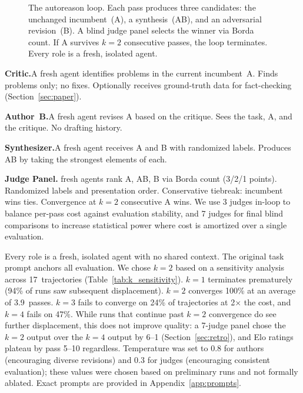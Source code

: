 \documentclass[11pt]{article}
\begin{document}
\begin{figure}[!ht]
{%
}%
\caption{The autoreason loop. Each pass produces three candidates: the unchanged incumbent~(A), a synthesis~(AB), and an adversarial revision~(B). A blind judge panel selects the winner via Borda count. If A survives $k{=}2$ consecutive passes, the loop terminates. Every role is a fresh, isolated agent.}
\label{fig:method}
\end{figure}

\textbf{Critic.}\enspace A fresh agent identifies problems in the current incumbent~A. Finds problems only; no fixes. Optionally receives ground-truth data for fact-checking (Section~\ref{sec:paper}).

\textbf{Author~B.}\enspace A fresh agent revises A based on the critique. Sees the task, A, and the critique. No drafting history.

\textbf{Synthesizer.}\enspace A fresh agent receives A and B with randomized labels. Produces AB by taking the strongest elements of each.

\textbf{Judge Panel.} fresh agents rank A, AB, B via Borda count (3/2/1 points). Randomized labels and presentation order. Conservative tiebreak: incumbent wins ties. Convergence at $k{=}2$ consecutive A wins. We use 3 judges in-loop to balance per-pass cost against evaluation stability, and 7 judges for final blind comparisons to increase statistical power where cost is amortized over a single evaluation.

Every role is a fresh, isolated agent with no shared context. The original task prompt anchors all evaluation. We chose $k{=}2$ based on a sensitivity analysis across 17~trajectories (Table~\ref{tab:k_sensitivity}). $k{=}1$ terminates prematurely (94\% of runs saw subsequent displacement). $k{=}2$ converges 100\% at an average of 3.9~passes. $k{=}3$ fails to converge on 24\% of trajectories at 2$\times$ the cost, and $k{=}4$ fails on 47\%. While runs that continue past $k{=}2$ convergence do see further displacement, this does not improve quality: a 7-judge panel chose the $k{=}2$ output over the $k{=}4$ output by 6--1 (Section~\ref{sec:retro}), and Elo ratings plateau by pass 5--10 regardless. Temperature was set to 0.8 for authors (encouraging diverse revisions) and 0.3 for judges (encouraging consistent evaluation); these values were chosen based on preliminary runs and not formally ablated. Exact prompts are provided in Appendix~\ref{app:prompts}.
\end{document}
